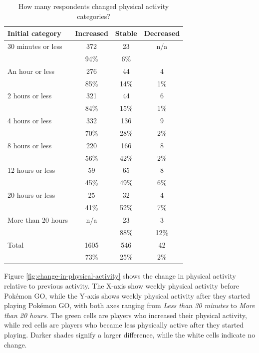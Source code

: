 \begin{table}[h]
	\centering
	\caption{How many respondents changed physical activity categories?}
	\label{tbl:physical-activity-changed-category}
	\begin{tabular}{|l|c|c|c|}
		\hline
		\textbf{Initial category} & \textbf{Increased} & \textbf{Stable} & \textbf{Decreased}\\
		\hline\hline
		30 minutes or less	& 372	& 23	& n/a\\
		& 94\%	& 6\%	& \\\hline
		An hour or less		& 276	& 44	& 4\\
		& 85\%	& 14\%	& 1\%\\\hline
		2 hours or less		& 321	& 44	& 6\\
		& 84\%	& 15\%	& 1\%\\\hline
		4 hours or less		& 332	& 136	& 9\\
		& 70\%	& 28\%	& 2\%\\\hline
		8 hours or less		& 220	& 166	& 8\\
		& 56\%	& 42\%	& 2\%\\\hline
		12 hours or less	& 59	& 65	& 8\\
		& 45\%	& 49\%	& 6\%\\\hline
		20 hours or less	& 25	& 32	& 4\\
		& 41\%	& 52\%	& 7\%\\\hline
		More than 20 hours	& n/a		& 23	& 3\\
		&	& 88\%	& 12\%\\\hline
		\hline
		Total				& 1605	& 546	& 42\\
		& 73\%	& 25\%	& 2\%\\\hline
	\end{tabular}
\end{table}

Figure \ref{fig:change-in-physical-activity} shows the change in physical activity relative to previous activity. The X-axis show weekly physical activity before Pokémon GO, while the Y-axis shows weekly physical activity after they started playing Pokémon GO, with both axes ranging from \emph{Less than 30 minutes} to \emph{More than 20 hours}. The green cells are players who increased their physical activity, while red cells are players who became less physically active after they started playing. Darker shades signify a larger difference, while the white cells indicate no change.

